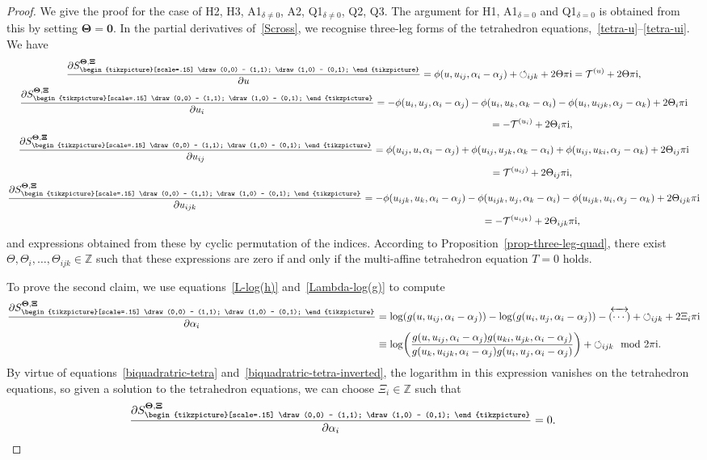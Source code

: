 \documentclass[10pt,a4paper]{amsart}
\newcommand{\reverse}{{\,\overleftrightarrow{\!(\cdots)\!}\,}}
\newcommand{\cross}{{\begin{tikzpicture}[scale=.15]
			\draw (0,0) -- (1,1);
			\draw (1,0) -- (0,1);
\end{tikzpicture}}}
\newcommand{\cyclic}{{\circlearrowleft}_{ijk}}
\newcommand{\pdv}[2]{\frac{\partial {#1}}{\partial {#2}}}
\newcommand{\Z}{\mathbb{Z}}
\renewcommand{\vec}{\boldsymbol}
\numberwithin{equation}{section}
\begin{document}
\begin{proof}\allowdisplaybreaks
 We give the proof for the case of H2, H3, A1$_{\delta\neq0}$, A2, Q1$_{\delta\neq0}$, Q2, Q3. The argument for H1, A1$_{\delta=0}$ and Q1$_{\delta=0}$ is obtained from this by setting $\vec \Theta = \vec 0$.
 In the partial derivatives of~\eqref{Scross}, we recognise three-leg forms of the tetrahedron equations,~\eqref{tetra-u}--\eqref{tetra-ui}. We have
 \begin{gather}
 \pdv{S^{\vec \Theta,\vec \Xi}_\cross}{u}
 = \phi(u,u_{ij},\alpha_i - \alpha_j) + \cyclic + 2 \Theta \pi {\rm i}
 = \mathcal{T}^{(u)} + 2 \Theta \pi {\rm i} , \label{cross-corners-u} \\
 \pdv{S^{\vec \Theta,\vec \Xi}_\cross}{u_i}
 = -\phi(u_i,u_j,\alpha_i - \alpha_j) - \phi(u_i,u_k,\alpha_k - \alpha_i) - \phi(u_i,u_{ijk},\alpha_j - \alpha_k) + 2 \Theta_i \pi {\rm i} \notag\\
 \hphantom{\pdv{S^{\vec \Theta,\vec \Xi}_\cross}{u_i}}{} = -\mathcal{T}^{(u_i)} + 2 \Theta_i \pi {\rm i} , \\
 \pdv{S^{\vec \Theta,\vec \Xi}_\cross}{u_{ij}}
 = \phi(u_{ij},u,\alpha_i-\alpha_j) + \phi(u_{ij},u_{jk},\alpha_k - \alpha_i) + \phi(u_{ij},u_{ki},\alpha_j-\alpha_k) + 2 \Theta_{ij} \pi {\rm i} \notag\\
 \hphantom{\pdv{S^{\vec \Theta,\vec \Xi}_\cross}{u_{ij}}}{} = \mathcal{T}^{(u_{ij})} + 2 \Theta_{ij} \pi {\rm i} , \\
 \pdv{S^{\vec \Theta,\vec \Xi}_\cross}{u_{ijk}}
 = -\phi(u_{ijk},u_k,\alpha_i-\alpha_j) - \phi(u_{ijk},u_j,\alpha_k - \alpha_i) - \phi(u_{ijk},u_{i},\alpha_j-\alpha_k) + 2 \Theta_{ijk} \pi {\rm i} \notag\\
 \hphantom{\pdv{S^{\vec \Theta,\vec \Xi}_\cross}{u_{ijk}}}{} = -\mathcal{T}^{(u_{ijk})} + 2 \Theta_{ijk} \pi {\rm i} , \label{cross-corners-uijk}
 \end{gather}
 and expressions obtained from these by cyclic permutation of the indices.
 According to Proposition~\ref{prop-three-leg-quad}, there exist $\Theta, \Theta_i, \dots, \Theta_{ijk} \in \Z$ such that these expressions are zero if and only if the multi-affine tetrahedron equation $T = 0$ holds.

 To prove the second claim, we use equations~\eqref{L-log(h)} and~\eqref{Lambda-log(g)} to compute
 \begin{align*}
 \pdv{S^{\vec \Theta,\vec \Xi}_\cross}{\alpha_i}
 &= \log(g(u,u_{ij},\alpha_i-\alpha_j)) - \log(g(u_i,u_j,\alpha_i-\alpha_j)) - \reverse + \cyclic + 2 \Xi_i \pi {\rm i} \\
 &\equiv \log \biggl( \frac{g(u,u_{ij},\alpha_i-\alpha_j) g(u_{ki},u_{jk},\alpha_i-\alpha_j)}{g(u_k,u_{ijk},\alpha_i-\alpha_j) g(u_i,u_j,\alpha_i-\alpha_j)} \biggr) + \cyclic \mod 2 \pi {\rm i} .
 \end{align*}
 By virtue of equations~\eqref{biquadratric-tetra} and~\eqref{biquadratric-tetra-inverted}, the logarithm in this expression vanishes on the tetrahedron equations, so given a solution to the tetrahedron equations, we can choose $\Xi_i \in \Z$ such that
 \[
 \pdv{S^{\vec \Theta,\vec \Xi}_\cross}{\alpha_i} = 0.\tag*{\qed}
 \]\renewcommand{\qed}{}
\end{proof}
\end{document}
